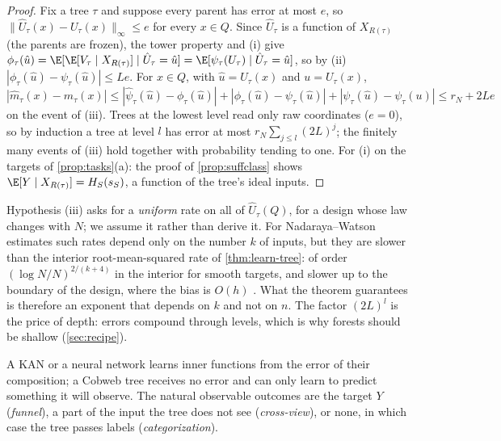 \begin{proof}
Fix a tree $\tau$ and suppose every parent has error at most $e$, so $\|\hat U_\tau(x)-
U_\tau(x)\|_\infty\le e$ for every $x\in Q$.  Since $\hat U_\tau$ is a function of $X_{R(\tau)}$
(the parents are frozen), the tower property and (i) give
$\phi_\tau(\hat u)=\E[\E[V_\tau\mid X_{R(\tau)}]\mid\hat U_\tau=\hat u]=\E[\psi_\tau(U_\tau)\mid\hat
U_\tau=\hat u]$, so by (ii) $|\phi_\tau(\hat u)-\psi_\tau(\hat u)|\le Le$.  For $x\in Q$, with
$\hat u=\hat U_\tau(x)$ and $u=U_\tau(x)$,
\[
  |\hat m_\tau(x)-m_\tau(x)|\le|\hat\psi_\tau(\hat u)-\phi_\tau(\hat u)|
  +|\phi_\tau(\hat u)-\psi_\tau(\hat u)|+|\psi_\tau(\hat u)-\psi_\tau(u)|\le r_N+2Le
\]
on the event of (iii).  Trees at the lowest level read only raw coordinates ($e=0$), so by
induction a tree at level $l$ has error at most $r_N\sum_{j\le l}(2L)^j$; the finitely many
events of (iii) hold together with probability tending to one.  For (i) on the targets of
\cref{prop:tasks}(a): the proof of \cref{prop:suffclass} shows
$\E[Y\mid X_{R(\tau)}]=H_S(s_S)$, a function of the tree's ideal inputs.
\end{proof}

Hypothesis (iii) asks for a \emph{uniform} rate on all of $\hat U_\tau(Q)$, for a design whose
law changes with $N$; we assume it rather than derive it.  For Nadaraya--Watson estimates such
rates depend only on the number $k$ of inputs, but they are slower than the interior
root-mean-squared rate of \cref{thm:learn-tree}: of order $(\log N/N)^{2/(k+4)}$ in the interior
for smooth targets, and slower up to the boundary of the design, where the bias is $O(h)$
\citep{gyorfi2002}.  What the theorem guarantees is therefore an exponent that depends on $k$
and not on $n$.  The factor $(2L)^l$ is the price of depth: errors compound through levels, which
is why forests should be shallow (\cref{sec:recipe}).

A KAN or a neural network learns inner functions from the error of their composition; a
Cobweb tree receives no error and can only learn to predict something it will observe.  The
natural observable outcomes are the target $Y$ (\emph{funnel}), a part of the input the tree
does not see (\emph{cross-view}), or none, in which case the tree passes labels
(\emph{categorization}).

